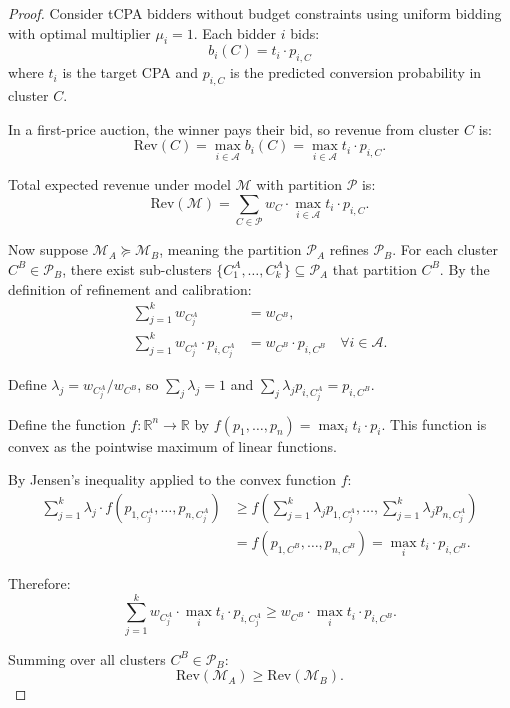 \documentclass{article}
\theoremstyle{plain}
\theoremstyle{definition}
\theoremstyle{remark}
\newcommand{\R}{\mathbb{R}}
\newcommand{\cA}{\mathcal{A}}
\newcommand{\cM}{\mathcal{M}}
\newcommand{\cP}{\mathcal{P}}
\begin{document}
\begin{proof}
Consider tCPA bidders without budget constraints using uniform bidding with optimal multiplier $\mu_i = 1$. Each bidder $i$ bids:
\begin{equation}
b_i(C) = t_i \cdot p_{i,C}
\end{equation}
where $t_i$ is the target CPA and $p_{i,C}$ is the predicted conversion probability in cluster $C$.

In a first-price auction, the winner pays their bid, so revenue from cluster $C$ is:
\begin{equation}
\text{Rev}(C) = \max_{i \in \cA} b_i(C) = \max_{i \in \cA} t_i \cdot p_{i,C}.
\end{equation}

Total expected revenue under model $\cM$ with partition $\cP$ is:
\begin{equation}
\text{Rev}(\cM) = \sum_{C \in \cP} w_C \cdot \max_{i \in \cA} t_i \cdot p_{i,C}.
\end{equation}

Now suppose $\cM_A \succeq \cM_B$, meaning the partition $\cP_A$ refines $\cP_B$. For each cluster $C^B \in \cP_B$, there exist sub-clusters $\{C^A_1, \ldots, C^A_k\} \subseteq \cP_A$ that partition $C^B$. By the definition of refinement and calibration:
\begin{align}
\sum_{j=1}^{k} w_{C^A_j} &= w_{C^B}, \\
\sum_{j=1}^{k} w_{C^A_j} \cdot p_{i, C^A_j} &= w_{C^B} \cdot p_{i, C^B} \quad \forall i \in \cA.
\end{align}

Define $\lambda_j = w_{C^A_j} / w_{C^B}$, so $\sum_j \lambda_j = 1$ and $\sum_j \lambda_j p_{i, C^A_j} = p_{i, C^B}$.

Define the function $f: \R^n \to \R$ by $f(p_1, \ldots, p_n) = \max_{i} t_i \cdot p_i$. This function is convex as the pointwise maximum of linear functions.

By Jensen's inequality applied to the convex function $f$:
\begin{align}
\sum_{j=1}^{k} \lambda_j \cdot f(p_{1, C^A_j}, \ldots, p_{n, C^A_j}) &\geq f\left(\sum_{j=1}^{k} \lambda_j p_{1, C^A_j}, \ldots, \sum_{j=1}^{k} \lambda_j p_{n, C^A_j}\right) \\
&= f(p_{1, C^B}, \ldots, p_{n, C^B}) = \max_{i} t_i \cdot p_{i, C^B}.
\end{align}

Therefore:
\begin{equation}
\sum_{j=1}^{k} w_{C^A_j} \cdot \max_{i} t_i \cdot p_{i, C^A_j} \geq w_{C^B} \cdot \max_{i} t_i \cdot p_{i, C^B}.
\end{equation}

Summing over all clusters $C^B \in \cP_B$:
\begin{equation}
\text{Rev}(\cM_A) \geq \text{Rev}(\cM_B).
\end{equation}
\end{proof}
\end{document}
